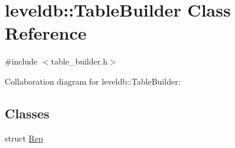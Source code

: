\hypertarget{classleveldb_1_1_table_builder}{\section{leveldb\-:\-:Table\-Builder Class Reference}
\label{classleveldb_1_1_table_builder}
}


{\ttfamily \#include $<$table\-\_\-builder.\-h$>$}



Collaboration diagram for leveldb\-:\-:Table\-Builder\-:
\subsection*{Classes}
\begin{DoxyCompactItemize}
\item 
struct \hyperlink{structleveldb_1_1_table_builder_1_1_rep}{Rep}
\end{DoxyCompactItemize}
